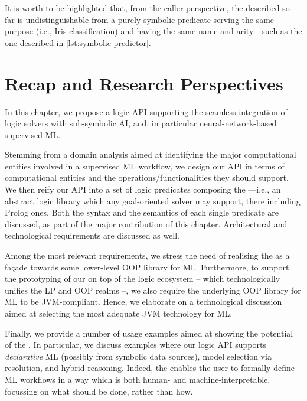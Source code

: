 \documentclass[12pt,a4paper,openright,twoside]{book}
\begin{document}
It is worth to be highlighted that, from the caller perspective, the  described so far is undistinguishable from a purely symbolic predicate serving the same purpose (i.e., Iris classification) and having the same name and arity---such as the one described in \cref{lst:symbolic-predictor}.



\section{Recap and Research Perspectives}
\label{sec:conclusions3}

In this chapter, we propose a logic API supporting the seamless integration of logic solvers with sub-symbolic AI, and, in particular neural-network-based supervised ML.

Stemming from a domain analysis aimed at identifying the major computational entities involved in a supervised ML workflow, we design our API in terms of computational entities and the operations/functionalities they should support.
%
We then reify our API into a set of logic predicates composing the \mllib{}---i.e., an abstract logic library which any goal-oriented solver may support, there including Prolog ones.
%
Both the syntax and the semantics of each single predicate are discussed, as part of the major contribution of this chapter.
%
Architectural and technological requirements are discussed as well.

Among the most relevant requirements, we stress the need of realising the \mllib{} as a façade towards some lower-level OOP library for ML.
%
Furthermore, to support the prototyping of our \mllib{} on top of the \twopkt{} logic ecosystem -- which technologically unifies the LP and OOP realms --, we also require the underlying OOP library for ML to be JVM-compliant.
%
Hence, we elaborate on a technological discussion aimed at selecting the most adequate JVM technology for ML.

Finally, we provide a number of usage examples aimed at showing the potential of the \mllib{}.
%
In particular, we discuss examples where our logic API supports \emph{declarative} ML (possibly from symbolic data sources), model selection via resolution, and hybrid reasoning.
%
Indeed, the \mllib{} enables the user to formally define ML workflows in a way which is both human- and machine-interpretable, focussing on what should be done, rather than how.
\end{document}
